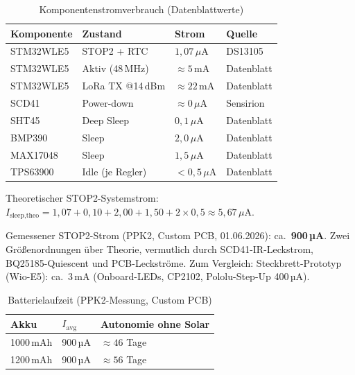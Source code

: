 \documentclass[11pt,a4paper]{scrartcl}
\begin{document}
\begin{table}[H]
  \centering
  \begin{tabular}{llll}
    \hline
    \textbf{Komponente} & \textbf{Zustand} & \textbf{Strom} & \textbf{Quelle} \\
    \hline
    STM32WLE5 & STOP2 + RTC      & $1{,}07\,\mu\text{A}$ & DS13105 \\
    STM32WLE5 & Aktiv (48\,MHz)  & $\approx5\,\text{mA}$ & Datenblatt \\
    STM32WLE5 & LoRa TX @14\,dBm & $\approx22\,\text{mA}$ & Datenblatt \\
    SCD41     & Power-down       & $\approx0\,\mu\text{A}$& Sensirion \\
    SHT45     & Deep Sleep       & $0{,}1\,\mu\text{A}$ & Datenblatt \\
    BMP390    & Sleep            & $2{,}0\,\mu\text{A}$ & Datenblatt \\
    MAX17048  & Sleep            & $1{,}5\,\mu\text{A}$ & Datenblatt \\
    TPS63900  & Idle (je Regler) & $<0{,}5\,\mu\text{A}$ & Datenblatt \\
    \hline
  \end{tabular}
  \caption{Komponentenstromverbrauch (Datenblattwerte)}
\end{table}

Theoretischer STOP2-Systemstrom: $I_\text{sleep,theo} = 1{,}07 + 0{,}10 + 2{,}00 + 1{,}50 + 2\times0{,}5 \approx 5{,}67\,\mu\text{A}$.

Gemessener STOP2-Strom (PPK2, Custom PCB, 01.06.2026): ca.~\textbf{900\,µA}. Zwei Größenordnungen über Theorie, vermutlich durch SCD41-IR-Leckstrom, BQ25185-Quiescent und PCB-Leckströme. Zum Vergleich: Steckbrett-Prototyp (Wio-E5): ca.~3\,mA (Onboard-LEDs, CP2102, Pololu-Step-Up 400\,µA).

\begin{table}[H]
  \centering
  \begin{tabular}{lll}
    \hline
    \textbf{Akku} & \textbf{$I_\text{avg}$} & \textbf{Autonomie ohne Solar} \\
    \hline
    1000\,mAh & 900\,µA & $\approx46$ Tage \\
    1200\,mAh & 900\,µA & $\approx56$ Tage \\
    \hline
  \end{tabular}
  \caption{Batterielaufzeit (PPK2-Messung, Custom PCB)}
\end{table}

\end{document}

